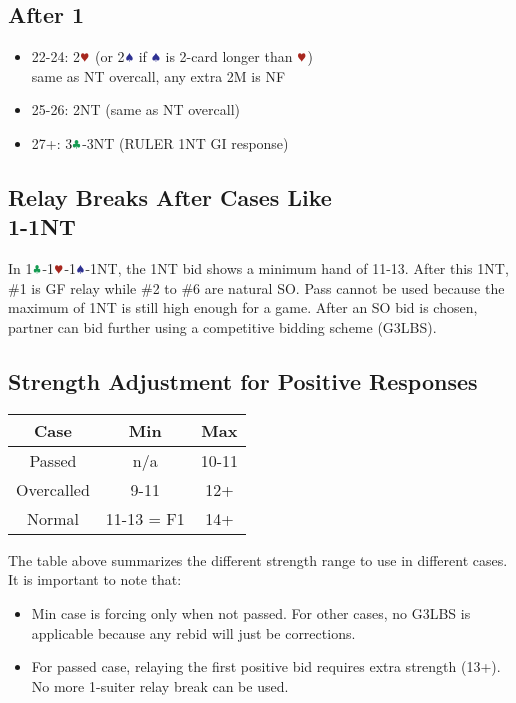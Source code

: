 \documentclass{article}
\begin{document}
\begin{multicols}{2}
\begin{CJK*}{UTF8}{gt}
\subsection{After 1\DDD}
\label{sec:1c1d1h1s2c2d}
\begin{itemize}
    \item 22-24: 2$\hhh$ (or 2$\sss$ if $\sss$ is 2-card longer than $\hhh$) \\
        same as NT overcall, any extra 2M is NF
    \item 25-26: 2NT (same as NT overcall)
    \item 27+: 3$\ccc$-3NT (RULER 1NT GI response)
\end{itemize}

\subsection{Relay Breaks After Cases Like \texorpdfstring{\\}{}
1\SSS-1NT}
In 1$\ccc$-1$\hhh$-1$\sss$-1NT, the 1NT bid shows a minimum hand of 11-13. After this 1NT, \#1 is GF relay while \#2 to \#6 are natural SO. Pass cannot be used because the maximum of 1NT is still high enough for a game. After an SO bid is chosen, partner can bid further using a competitive bidding scheme (G3LBS).

\subsection{Strength Adjustment for Positive Responses}
\begin{tabular}{c|c|c}
    \hline
    Case & Min & Max \\ \hline
    Passed & n/a & 10-11 \\ \hline
    Overcalled & 9-11 & 12+ \\ \hline
    Normal & 11-13 = F1 & 14+ \\ \hline
\end{tabular}\vspace{0.5em}

\noindent The table above summarizes the different strength range to use in different cases. It is important to note that:
\begin{itemize}
    \item Min case is forcing only when not passed. For other cases, no G3LBS is applicable because any rebid will just be corrections.
    \item For passed case, relaying the first positive bid requires extra strength (13+). No more 1-suiter relay break can be used.
\end{itemize}


\end{CJK*}
\end{multicols}
\end{document}
